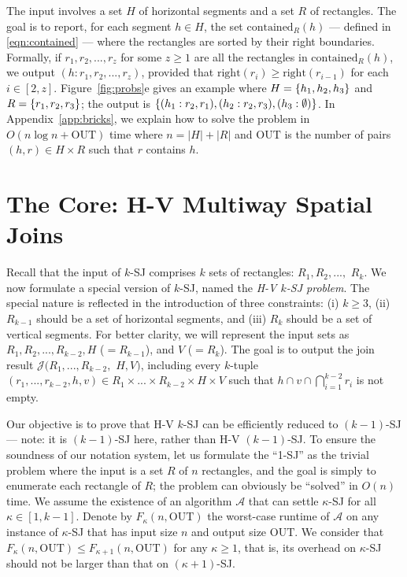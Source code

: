 \documentclass[sigconf]{acmart}
\def\vgap{\vspace{0mm}}
\def\extraspacing{\vspace{1.5mm} \noindent}
\def\A{\mathcal{A}}
\def\J{\mathcal{J}}
\def\xright{\mathrm{right}}
\def\contained{\mathrm{contained}}
\def\out{\mathrm{OUT}}
\begin{document}
\extraspacing {\bf Problem $\bm{\mathscr{E}}$.} The input involves a set $H$ of horizontal segments and a set $R$ of rectangles. The goal is to report, for each segment $h \in H$, the set $\contained_R(h)$ --- defined in \eqref{eqn:contained} --- where the rectangles are sorted by their right boundaries. Formally, if $r_1, r_2, ..., r_z$ for some $z \ge 1$ are all the rectangles in $\contained_R(h)$, we output $(h: r_1, r_2, ..., r_z)$, provided that $\xright(r_i) \ge \xright(r_{i-1})$ for each $i \in [2, z]$. Figure~\ref{fig:probs}e gives an example where $H = \{h_1, h_2, h_3\}$ and $R = \{r_1, r_2, r_3\}$; the output is $\{(h_1: r_2, r_1), (h_2: r_2, r_3), (h_3: \emptyset)\}$. In Appendix~\ref{app:bricks}, we explain how to solve the problem in $O(n \log n + \out)$ time where $n = |H| + |R|$ and $\out$ is the number of pairs $(h, r) \in H \times R$ such that $r$ contains $h$.


\section{The Core: H-V Multiway Spatial Joins} \label{sec:hv}

Recall that the input of $k$-SJ comprises $k$ sets of rectangles: $R_1, R_2, ...,$ $R_k$. We now formulate a special version of $k$-SJ, named the {\em H-V $k$-SJ problem}. The special nature is reflected in the introduction of three constraints: (i) $k \ge 3$, (ii) $R_{k-1}$ should be a set of horizontal segments, and (iii) $R_k$ should be a set of vertical segments. For better clarity, we will represent the input sets as $R_1, R_2, ..., R_{k-2}, H$ ($=R_{k-1}$), and $V$ ($=R_k$). The goal is to output the join result $\J(R_1, ..., R_{k-2},$ $H, V)$, including every $k$-tuple $(r_1, ..., r_{k-2}, h, v) \in R_1 \times ... \times R_{k-2} \times H \times V$ such that $h \cap v \cap \bigcap_{i=1}^{k-2} r_i$ is not empty.

\vgap

Our objective is to prove that H-V $k$-SJ can be efficiently reduced to $(k-1)$-SJ --- note: it is $(k-1)$-SJ here, rather than H-V $(k-1)$-SJ. To ensure the soundness of our notation system, let us formulate the ``1-SJ'' as the trivial problem where the input is a set $R$ of $n$ rectangles, and the goal is simply to enumerate each rectangle of $R$; the problem can obviously be ``solved'' in $O(n)$ time. We assume the existence of an algorithm $\A$ that can settle $\kappa$-SJ for all $\kappa \in [1, k-1]$. Denote by $F_\kappa(n, \out)$ the worst-case runtime of $\A$ on any instance of $\kappa$-SJ that has input size $n$ and output size $\out$. We consider that $F_\kappa(n, \out) \le F_{\kappa + 1}(n, \out)$ for any $\kappa \ge 1$, that is, its overhead on $\kappa$-SJ should not be larger than that on $(\kappa+1)$-SJ.
\end{document}
